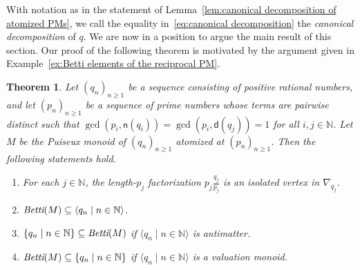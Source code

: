 \documentclass[12pt]{amsart}
\newtheorem{theorem}{Theorem}[section]
\theoremstyle{definition}
\numberwithin{equation}{section}
\newcommand{\nn}{\mathbb{N}}
\begin{document}
With notation as in the statement of Lemma~\ref{lem:canonical decomposition of atomized PMs}, we call the equality in~\eqref{eq:canonical decomposition} the \emph{canonical decomposition} of $q$. We are now in a position to argue the main result of this section. Our proof of the following theorem is motivated by the argument given in Example~\ref{ex:Betti elements of the reciprocal PM}.

\begin{theorem} \label{thm:atomization and Betti elements}
	Let $(q_n)_{n \ge 1}$ be a sequence consisting of positive rational numbers, and let $(p_n)_{n \ge 1}$ be a sequence of prime numbers whose terms are pairwise distinct such that $\gcd(p_i, \mathsf{n}(q_i)) = \gcd(p_i, \mathsf{d}(q_j)) = 1$ for all $i,j \in \nn$. Let $M$ be the Puiseux monoid of $(q_n)_{n \ge 1}$ atomized at $(p_n)_{n \ge 1}$. Then the following statements hold.
	\begin{enumerate}
		\item For each $j \in \mathbb{N}$, the length-$p_j$ factorization $p_j \frac{q_j}{p_j}$ is an isolated vertex in $\nabla_{q_j}$.
		
		\item $\emph{Betti}(M) \subseteq \langle q_n \mid n \in \nn \rangle$.
		\smallskip
		
		\item $\{q_n \mid n \in \nn\} \subseteq \emph{Betti}(M)$ if $\langle q_n \mid n \in \nn \rangle$ is antimatter.
		\smallskip
		
		\item $\emph{Betti}(M) \subseteq \{q_n \mid n \in \nn\}$ if $\langle q_n \mid n \in \nn \rangle$ is a valuation monoid.
	\end{enumerate}
\end{theorem}
\end{document}
